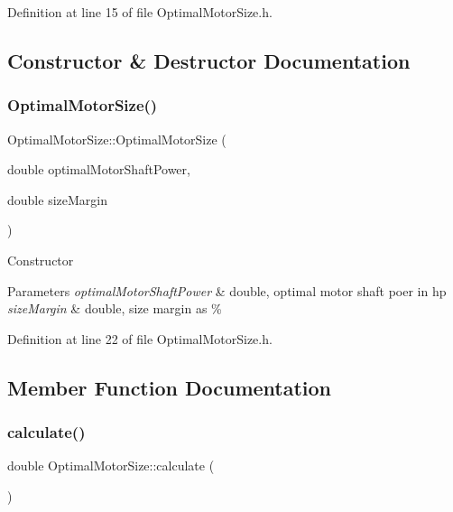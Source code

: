 Definition at line 15 of file Optimal\+Motor\+Size.\+h.



\subsection{Constructor \& Destructor Documentation}
\mbox{\label{class_optimal_motor_size_ad051dd00b8879fc4232536c936e98be1}} 
\subsubsection{\texorpdfstring{Optimal\+Motor\+Size()}{OptimalMotorSize()}}
{\footnotesize\ttfamily Optimal\+Motor\+Size\+::\+Optimal\+Motor\+Size (\begin{DoxyParamCaption}\item[{double}]{optimal\+Motor\+Shaft\+Power,  }\item[{double}]{size\+Margin }\end{DoxyParamCaption})\hspace{0.3cm}{\ttfamily [inline]}}

Constructor 
\begin{DoxyParams}{Parameters}
{\em optimal\+Motor\+Shaft\+Power} & double, optimal motor shaft poer in hp \\
\hline
{\em size\+Margin} & double, size margin as \% \\
\hline
\end{DoxyParams}


Definition at line 22 of file Optimal\+Motor\+Size.\+h.



\subsection{Member Function Documentation}
\mbox{\label{class_optimal_motor_size_aa9f4e68b9e1807d20e7738cd0789a539}} 
\subsubsection{\texorpdfstring{calculate()}{calculate()}}
{\footnotesize\ttfamily double Optimal\+Motor\+Size\+::calculate (\begin{DoxyParamCaption}{ }\end{DoxyParamCaption})}



